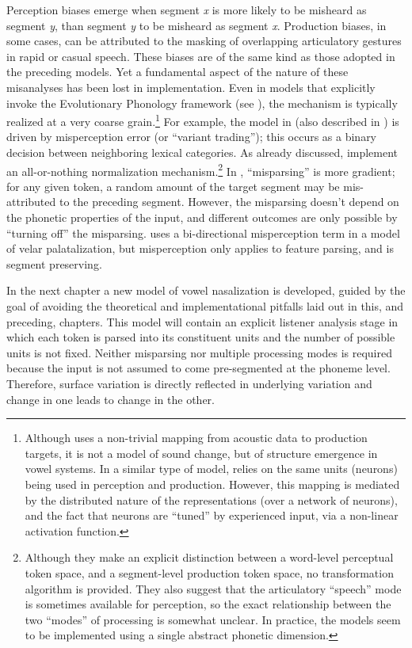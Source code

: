 Perception biases emerge when segment \emph{x} is more likely to be
misheard as segment \emph{y}, than segment \emph{y} to be misheard
as segment \emph{x}. Production biases, in some cases, can be attributed
to the masking of overlapping articulatory gestures in rapid or casual
speech. These biases are of the same kind as those adopted in the
preceding models. Yet a fundamental aspect of the nature of these
misanalyses has been lost in implementation. Even in models that explicitly
invoke the Evolutionary Phonology framework (see \citealt{Blevins2004}),
the mechanism is typically realized at a very coarse grain.\footnote{Although \citet{Boer2000} uses a non-trivial mapping from acoustic
data to production targets, it is not a model of sound change, but
of structure emergence in vowel systems. In a similar type of model,
\citet{oudeyer2006self} relies on the same units (neurons) being
used in perception and production. However, this mapping is mediated
by the distributed nature of the representations (over a network of
neurons), and the fact that neurons are ``tuned'' by experienced input,
via a non-linear activation function. } For example, the model in \citet{wedel2017category} (also described
in \citet{Blevins2009}) is driven by misperception error (or “variant
trading”); this occurs as a binary decision between neighboring
lexical categories. As already discussed, \citet{Garrett2013} implement
an all-or-nothing normalization mechanism.\footnote{Although they make an explicit distinction between a word-level perceptual
token space, and a segment-level production token space, no transformation
algorithm is provided. They also suggest that the articulatory ``speech''
mode is sometimes available for perception, so the exact relationship
between the two ``modes'' of processing is somewhat unclear. In practice,
the models seem to be implemented using a single abstract phonetic
dimension.} In \citet{Kirby2014}, ``misparsing'' is more gradient; for any given
token, a random amount of the target segment may be mis-attributed
to the preceding segment. However, the misparsing doesn't depend on
the phonetic properties of the input, and different outcomes are only
possible by ``turning off'' the misparsing. \citet{morley2014implications}
uses a bi-directional misperception term in a model of velar palatalization,
but misperception only applies to feature parsing, and is segment
preserving. 

In the next chapter a new model of vowel nasalization is developed,
guided by the goal of avoiding the theoretical and implementational
pitfalls laid out in this, and preceding, chapters. This model will
contain an explicit listener analysis stage in which each token is parsed into its constituent units and the number of possible units is not fixed. Neither misparsing nor multiple processing modes is required because the input is not assumed to come pre-segmented at the phoneme level. Therefore, surface variation is directly reflected in underlying variation and change in one leads to change in the other.

